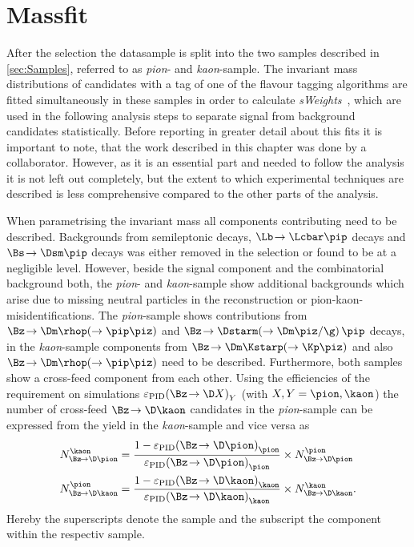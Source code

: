 \chapter{Massfit}
\label{ch:massfit}


After the selection the datasample is split into the two samples described in \cref{sec:Samples}, referred to as \emph{pion}- and \emph{kaon}-sample.
The invariant \Bz mass distributions of candidates with a tag of one of the flavour tagging algorithms are fitted simultaneously in these samples in order to calculate \emph{sWeights}~\cite{Pivk:2004ty}, which are used in the following analysis steps to separate signal from background candidates statistically.
Before reporting in greater detail about this fits it is important to note, that the work described in this chapter was done by a collaborator.
However, as it is an essential part and needed to follow the analysis it is not left out completely, but the extent to which \eg experimental techniques are described is less comprehensive compared to the other parts of the analysis.

When parametrising the invariant \Bz mass all components contributing need to be described. Backgrounds from semileptonic decays, $\Lb\!\to\Lcbar\pip$ decays and $\Bs\!\to\Dsm\pip$ decays was either removed in the selection or found to be at a negligible level.
However, beside the signal component and the combinatorial background both, the \emph{pion}- and \emph{kaon}-sample show additional backgrounds which arise due to missing neutral particles in the reconstruction or pion-kaon-misidentifications.
The \emph{pion}-sample shows contributions from $\Bz\!\to\Dm\rhop\!\left(\to\pip\piz\right)$ and $\Bz\!\to\Dstarm\!\left(\to\Dm\piz/\g\right)\pip$ decays, in the \emph{kaon}-sample components from $\Bz\!\to\Dm\Kstarp\!\left(\to\Kp\piz\right)$ and also $\Bz\!\to\Dm\rhop\!\left(\to\pip\piz\right)$  need to be described.
Furthermore, both samples show a cross-feed component from each other.
Using the efficiencies of the \dllkpi requirement on simulations $\varepsilon_{\text{PID}}\!\left(\Bz\!\to\D X\right)_Y$ (with $X, Y=\pion, \kaon$) the number of cross-feed $\Bz\!\to\D\kaon$ candidates in the \emph{pion}-sample can be expressed from the yield in the \emph{kaon}-sample and vice versa as
\begin{equation}
\begin{aligned}
N_{\Bz\!\to\D\pion}^{\kaon}&=\frac{1-\varepsilon_{\text{PID}}\!\left(\Bz\!\to\D \pion\right)_{\pion}}{\varepsilon_{\text{PID}}\!\left(\Bz\!\to\D \pion\right)_{\pion}}\times N_{\Bz\!\to\D\pion}^{\pion} \\
N_{\Bz\!\to\D\kaon}^{\pion}&=\frac{1-\varepsilon_{\text{PID}}\!\left(\Bz\!\to\D \kaon\right)_{\kaon}}{\varepsilon_{\text{PID}}\!\left(\Bz\!\to\D \kaon\right)_{\kaon}}\times N_{\Bz\!\to\D\kaon}^{\kaon}.\label{eq:ConstrainCrossFeed}
\end{aligned}
\end{equation}
Hereby the superscripts denote the sample and the subscript the component within the respectiv sample.

